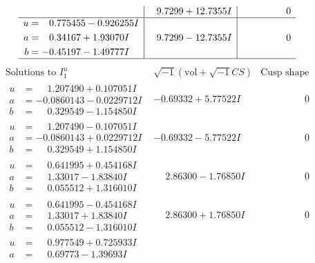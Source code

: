 \documentclass[1p]{elsarticle_modified}
\theoremstyle{definition}
\newcommand{\I}{\sqrt{-1}}
\begin{document}
$$\begin{array}{c|c|c}
 & \phantom{-}9.7299 + 12.7355 I & \phantom{-0.000000 } 0 \\ \hline\begin{aligned}
u &= \phantom{-}0.775455 - 0.926255 I \\
a &= \phantom{-}0.34167 + 1.93070 I \\
b &= -0.45197 - 1.49777 I\end{aligned}
 & \phantom{-}9.7299 - 12.7355 I & \phantom{-0.000000 } 0\\
 \hline 
 \end{array}$$\newpage$$\begin{array}{c|c|c}  
\text{Solutions to }I^u_{1}& \I (\text{vol} + \sqrt{-1}CS) & \text{Cusp shape}\\
 \hline 
\begin{aligned}
u &= \phantom{-}1.207490 + 0.107051 I \\
a &= -0.0860143 - 0.0229712 I \\
b &= \phantom{-}0.329549 - 1.154850 I\end{aligned}
 & -0.69332 + 5.77522 I & \phantom{-0.000000 } 0 \\ \hline\begin{aligned}
u &= \phantom{-}1.207490 - 0.107051 I \\
a &= -0.0860143 + 0.0229712 I \\
b &= \phantom{-}0.329549 + 1.154850 I\end{aligned}
 & -0.69332 - 5.77522 I & \phantom{-0.000000 } 0 \\ \hline\begin{aligned}
u &= \phantom{-}0.641995 + 0.454168 I \\
a &= \phantom{-}1.33017 - 1.83840 I \\
b &= \phantom{-}0.055512 + 1.316010 I\end{aligned}
 & \phantom{-}2.86300 - 1.76850 I & \phantom{-0.000000 } 0 \\ \hline\begin{aligned}
u &= \phantom{-}0.641995 - 0.454168 I \\
a &= \phantom{-}1.33017 + 1.83840 I \\
b &= \phantom{-}0.055512 - 1.316010 I\end{aligned}
 & \phantom{-}2.86300 + 1.76850 I & \phantom{-0.000000 } 0 \\ \hline\begin{aligned}
u &= \phantom{-}0.977549 + 0.725933 I \\
a &= \phantom{-}0.69773 - 1.39693 I \\

\end{aligned}
\end{array}$$
\end{document}
